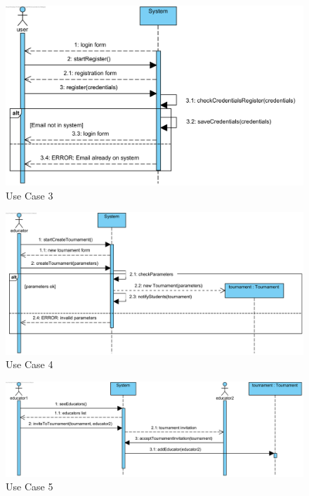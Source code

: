 \documentclass{article}
\begin{document}
\begin{figure}[H]
    \centering
    \includegraphics[width=1\textwidth]{images/UseCaseSequenceDiagrams/UC3}
    \caption{Use Case 3}
    \label{fig:UC3}
\end{figure}

\begin{figure}[H]
    \centering
    \includegraphics[width=1\textwidth]{images/UseCaseSequenceDiagrams/UC4}
    \caption{Use Case 4}
    \label{fig:UC4}
\end{figure}

\begin{figure}[H]
    \centering
    \includegraphics[width=1\textwidth]{images/UseCaseSequenceDiagrams/UC5}
    \caption{Use Case 5}
    \label{fig:UC5}
\end{figure}
\end{document}
